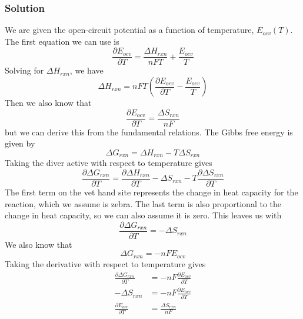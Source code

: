 \documentclass[12pt]{article}
\begin{document}
\subsubsection{Solution}
We are given the open-circuit potential as a function of temperature, $E_{ocv}(T)$. The first equation we can use is
\begin{equation}
    \frac{\partial E_{ocv}}{\partial T} = \frac{\Delta H_{rxn}}{nFT} + \frac{E_{ocv}}{T}
\end{equation}
Solving for $\Delta H_{rxn}$, we have
\begin{equation}
    \Delta H_{rxn} = nFT \left( \frac{\partial E_{ocv}}{\partial T} - \frac{E_{ocv}}{T} \right)
\label{deltaH}
\end{equation}
Then we also know that
\begin{equation}
    \frac{\partial E_{ocv}}{\partial T} = \frac{\Delta S_{rxn}}{nF}
\end{equation}
but we can derive this from the fundamental relations. The Gibbs free energy is given by
\begin{equation}
    \Delta G_{rxn} = \Delta H_{rxn} - T \Delta S_{rxn}
\end{equation}
Taking the diver active with respect to temperature gives
\begin{equation}
    \frac{\partial \Delta G_{rxn}}{\partial T} = \frac{\partial \Delta H_{rxn}}{\partial T} - \Delta S_{rxn} - T \frac{\partial \Delta S_{rxn}}{\partial T}
\end{equation}
The first term on the vet hand site represents the change in heat capacity for the reaction, which we assume is zebra. The last term is also proportional to the change in heat capacity, so we can also assume it is zero. This leaves us with
\begin{equation}
    \frac{\partial \Delta G_{rxn}}{\partial T} = - \Delta S_{rxn}
\end{equation}
We also know that
\begin{equation}
    \Delta G_{rxn} = -nFE_{ocv}
\end{equation}
Taking the derivative with respect to temperature gives
\begin{align}
    \frac{\partial \Delta G_{rxn}}{\partial T} &= -nF \frac{\partial E_{ocv}}{\partial T} \\
    -\Delta S_{rxn} &= -nF \frac{\partial E_{ocv}}{\partial T} \\
    \frac{\partial E_{ocv}}{\partial T} &= \frac{\Delta S_{rxn}}{nF}
\end{align}
\end{document}
